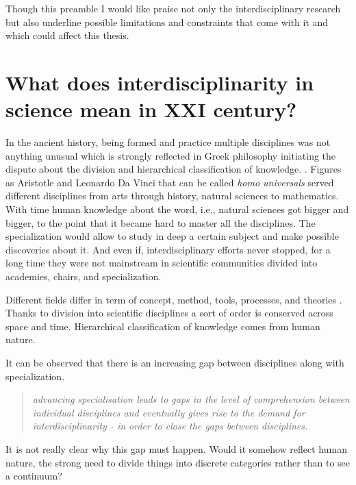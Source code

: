 \documentclass[12pt,]{book}
\theoremstyle{definition}
\theoremstyle{definition}
\theoremstyle{definition}
\theoremstyle{remark}
\begin{document}
Though this preamble I would like praise not only the interdisciplinary
research but also underline possible limitations and constraints that
come with it and which could affect this thesis.

\hypertarget{what-does-interdisciplinarity-in-science-mean-in-xxi-century}{%
\section*{What does interdisciplinarity in science mean in XXI
century?}\label{what-does-interdisciplinarity-in-science-mean-in-xxi-century}}

In the ancient history, being formed and practice multiple disciplines
was not anything unusual which is strongly reflected in Greek philosophy
initiating the dispute about the division and hierarchical
classification of knowledge. \citep{Slavicek2012}. Figures as Aristotle
and Leonardo Da Vinci that can be called \emph{homo universals} served
different disciplines from arts through history, natural sciences to
mathematics. With time human knowledge about the word, i.e., natural
sciences got bigger and bigger, to the point that it became hard to
master all the disciplines. The specialization would allow to study in
deep a certain subject and make possible discoveries about it. And even
if, interdisciplinary efforts never stopped, for a long time they were
not mainstream in scientific communities divided into academies, chairs,
and specialization.

Different fields differ in term of concept, method, tools, processes,
and theories \citep{Slavicek2012}. Thanks to division into scientific
disciplines a sort of order is conserved across space and time.
Hierarchical classification of knowledge comes from human nature.

It can be observed that there is an increasing gap between disciplines
along with specialization.

\begin{quote}
\emph{advancing specialisation leads to gaps in the level of
comprehension between individual disciplines and eventually gives rise
to the demand for interdisciplinarity - in order to close the gaps
between disciplines.}\citep{Slavicek2012}
\end{quote}

It is not really clear why this gap must happen. Would it somehow
reflect human nature, the strong need to divide things into discrete
categories rather than to see a continuum?
\end{document}

